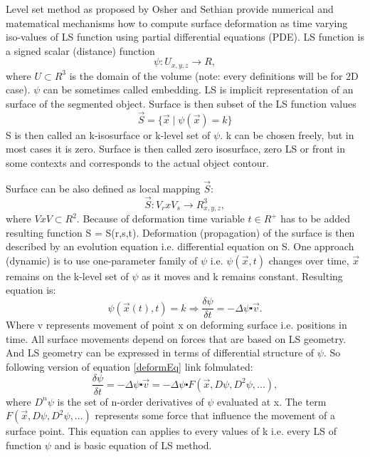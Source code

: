 Level set method as proposed by Osher and Sethian \cite{sethianLS} provide numerical and matematical mechanisms how to compute surface deformation as time varying iso-values of LS function using partial differential equations (PDE). 
LS function is a signed scalar (distance) function 
\begin{equation}
\psi : U_{x,y,z} \rightarrow R,
\end{equation}
where $U \subset R^3$ is the domain of the volume (note: every definitions will be for 2D case). $\psi$ can be sometimes called embedding. LS is implicit representation of an surface of the segmented object. Surface is then subset of the LS function values
\begin{equation}
\vec{S} = \{\vec{x}\mid \psi(\vec{x}) = k\}
\end{equation}
S is then called an k-isosurface or k-level set of $\psi$. k can be chosen freely, but in most cases it is zero. Surface is then called zero isosurface, zero LS or front in some contexts and corresponds to the actual object contour. 

Surface can be also defined as local mapping $\vec{S}$:
\begin{equation}
\vec{S}: V_r x V_s \rightarrow R^3_{x,y,z},
\end{equation}
where $V x V \subset R^2$. Because of deformation time variable $t \in R^+$ has to be added resulting function S = S(r,s,t). 
Deformation (propagation) of the surface is then described by an evolution equation i.e. differential equation on S. One approach (dynamic) is to use one-parameter family of $\psi$ i.e. $\psi(\vec{x},t)$ changes over time, $\vec{x}$ remains on the k-level set of $\psi$ as it moves and k remains constant. Resulting equation is:
\begin{equation}
\label{deformEq}
\psi(\vec{x}(t),t) = k \Rightarrow \frac{\delta \psi}{\delta t} = - \Delta \psi \centerdot \vec{v}.
\end{equation}
Where v represents movement of point x on deforming surface i.e. positions in time.
All surface movements depend on forces that are based on LS geometry. And LS geometry can be expressed in terms of differential structure of $\psi$. So following version of equation \ref{deformEq} link folmulated:
\begin{equation}
\frac{\delta\psi}{\delta t} = - \Delta \psi \centerdot \vec{v} = - \Delta \psi \centerdot F(\vec{x}, D\psi, D^2\psi, ...),
\end{equation}
where $D^n\psi$ is the set of n-order derivatives of $\psi$ evaluated at x. The term $F(\vec{x}, D\psi, D^2\psi, ...)$ represents some force that influence the movement of a surface point. This equation can applies to every values of k i.e. every LS of function $\psi$ and is basic equation of LS method.

